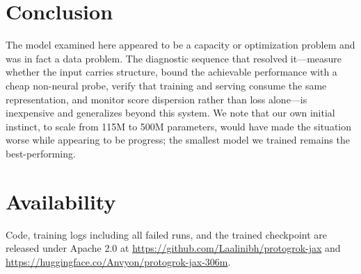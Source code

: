 \documentclass[11pt]{article}
\begin{document}
\section{Conclusion}

The model examined here appeared to be a capacity or optimization problem and was
in fact a data problem. The diagnostic sequence that resolved it---measure
whether the input carries structure, bound the achievable performance with a
cheap non-neural probe, verify that training and serving consume the same
representation, and monitor score dispersion rather than loss alone---is
inexpensive and generalizes beyond this system. We note that our own initial
instinct, to scale from 115M to 500M parameters, would have made the situation
worse while appearing to be progress; the smallest model we trained remains the
best-performing.

\section*{Availability}

Code, training logs including all failed runs, and the trained checkpoint are
released under Apache 2.0 at
\url{https://github.com/Laalinibh/protogrok-jax} and
\url{https://huggingface.co/Anvyon/protogrok-jax-306m}.
\end{document}
